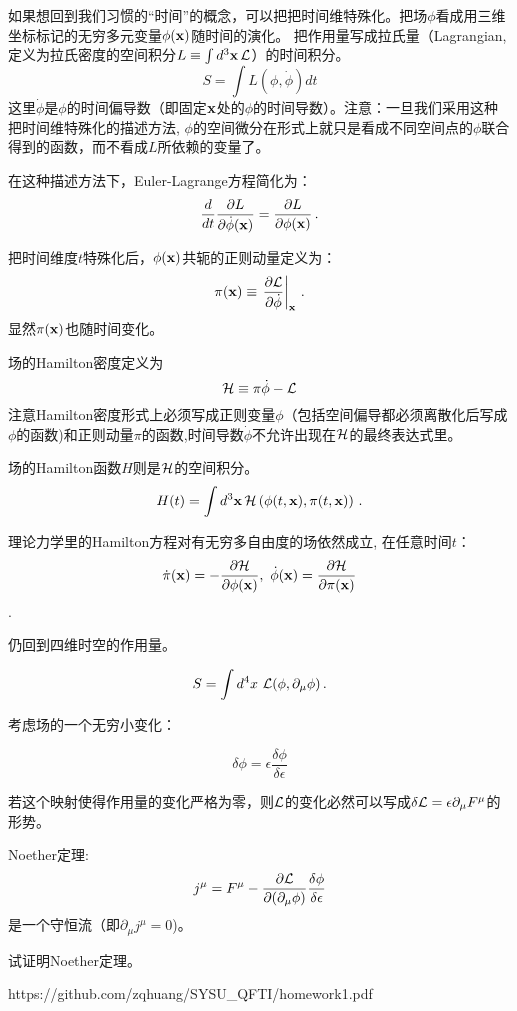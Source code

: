 \documentclass[CJK]{beamer}
\begin{document}
\begin{frame}
\bch
如果想回到我们习惯的“时间”的概念，可以把把时间维特殊化。把场$\phi$看成用三维坐标标记的无穷多元变量$\phi({\mathbf{x}})$随时间的演化。
把作用量写成拉氏量（Lagrangian, 定义为拉氏密度的空间积分$L \equiv \int d^3{\mathbf{x}}\, {\mathcal{L}}$）的时间积分。
$$S = \int L(\phi,\dot\phi) dt$$
这里$\dot\phi$是$\phi$的时间偏导数（即固定${\mathbf{x}}$处的$\phi$的时间导数）。注意：一旦我们采用这种把时间维特殊化的描述方法, $\phi$的空间微分在形式上就只是看成不同空间点的$\phi$联合得到的函数，而不看成$L$所依赖的变量了。

在这种描述方法下，Euler-Lagrange方程简化为：
$$\frac{d}{dt} \frac{\partial L}{\partial \dot\phi({\mathbf{x}})} = \frac{\partial L}{\partial \phi({\mathbf{x}})}\,.$$

\skipline

\ech
\end{frame}


\begin{frame}
\bch
把时间维度$t$特殊化后，$\phi({\mathbf{x}})$共轭的正则动量定义为：
$$ \pi({\mathbf{x}}) \equiv \left.\frac{\partial{\mathcal{L}}}{\partial\dot\phi}\right\vert_{{\mathbf{x}}} \,.$$
显然$\pi({\mathbf{x}})$也随时间变化。

场的Hamilton密度定义为
$$ {\mathcal{H}} \equiv \pi \dot\phi- {\mathcal{L}} $$
注意Hamilton密度形式上必须写成正则变量$\phi$（包括空间偏导都必须离散化后写成$\phi$的函数)和正则动量$\pi$的函数,时间导数$\dot\phi$不允许出现在${\mathcal{H}}$的最终表达式里。

场的Hamilton函数$H$则是${\mathcal{H}}$的空间积分。
$$ H(t) = \int d^3{\mathbf{x}}\, {\mathcal{H}}\left(\phi(t,{\mathbf{x}}), \pi(t,{\mathbf{x}})\right)\,.$$
\ech
\end{frame}

\begin{frame}
\bch
理论力学里的Hamilton方程对有无穷多自由度的场依然成立, 在任意时间$t$：
$$\dot\pi({\mathbf{x}}) = -\frac{\partial {\mathcal{H}}}{\partial\phi({\mathbf{x}})},\ \dot\phi({\mathbf{x}}) = \frac{\partial{\mathcal{H}}}{\partial\pi({\mathbf{x}})}$$.
\ech
\end{frame}

\begin{frame}
\bch
仍回到四维时空的作用量。

$$S = \int d^4x\ {\mathcal{L}}(\phi, \partial_\mu\phi)\,.$$

考虑场的一个无穷小变化：

$$\delta \phi = \epsilon \frac{\delta\phi}{\delta\epsilon}$$

若这个映射使得作用量的变化严格为零，则${\mathcal{L}}$的变化必然可以写成$ \delta {\mathcal{L}} = \epsilon \partial_\mu F^\mu$的形势。

Noether定理: $$j^\mu = F^\mu - \frac{\partial{\mathcal{L}}}{\partial (\partial_\mu\phi)} \frac{\delta\phi}{\delta\epsilon}$$ 是一个守恒流（即$\partial_\mu j^\mu = 0$)。

\ech
\end{frame}

\begin{frame}
\bch
试证明Noether定理。
\ech
\end{frame}

\begin{frame}
\bch
https://github.com/zqhuang/SYSU\_QFTI/homework1.pdf
\ech
\end{frame}
\end{document}
